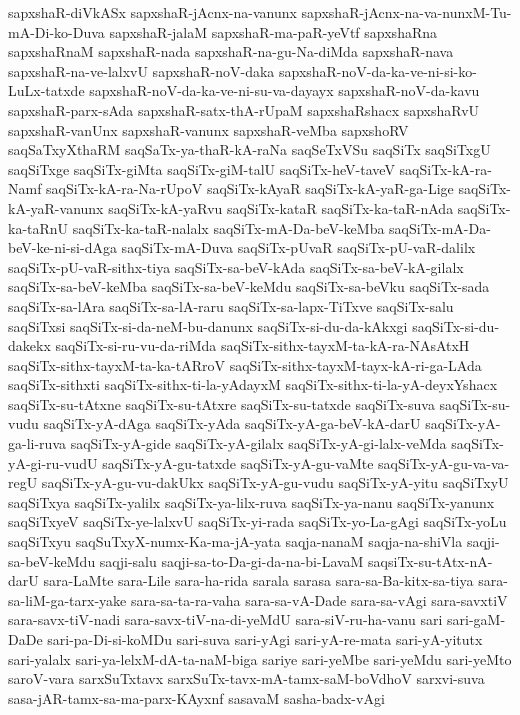 {sapxshaR-diVkASx
sapxshaR-jAcnx-na-vanunx
sapxshaR-jAcnx-na-va-nunxM-Tu-mA-Di-ko-Duva
sapxshaR-jalaM
sapxshaR-ma-paR-yeVtf
sapxshaRna
sapxshaRnaM
sapxshaR-nada
sapxshaR-na-gu-Na-diMda
sapxshaR-nava
sapxshaR-na-ve-lalxvU
sapxshaR-noV-daka
sapxshaR-noV-da-ka-ve-ni-si-ko-LuLx-tatxde
sapxshaR-noV-da-ka-ve-ni-su-va-dayayx
sapxshaR-noV-da-kavu
sapxshaR-parx-sAda
sapxshaR-satx-thA-rUpaM
sapxshaRshacx
sapxshaRvU
sapxshaR-vanUnx
sapxshaR-vanunx
sapxshaR-veMba
sapxshoRV
saqSaTxyXthaRM
saqSaTx-ya-thaR-kA-raNa
saqSeTxVSu
saqSiTx
saqSiTxgU
saqSiTxge
saqSiTx-giMta
saqSiTx-giM-talU
saqSiTx-heV-taveV
saqSiTx-kA-ra-Namf
saqSiTx-kA-ra-Na-rUpoV
saqSiTx-kAyaR
saqSiTx-kA-yaR-ga-Lige
saqSiTx-kA-yaR-vanunx
saqSiTx-kA-yaRvu
saqSiTx-kataR
saqSiTx-ka-taR-nAda
saqSiTx-ka-taRnU
saqSiTx-ka-taR-nalalx
saqSiTx-mA-Da-beV-keMba
saqSiTx-mA-Da-beV-ke-ni-si-dAga
saqSiTx-mA-Duva
saqSiTx-pUvaR
saqSiTx-pU-vaR-dalilx
saqSiTx-pU-vaR-sithx-tiya
saqSiTx-sa-beV-kAda
saqSiTx-sa-beV-kA-gilalx
saqSiTx-sa-beV-keMba
saqSiTx-sa-beV-keMdu
saqSiTx-sa-beVku
saqSiTx-sada
saqSiTx-sa-lAra
saqSiTx-sa-lA-raru
saqSiTx-sa-lapx-TiTxve
saqSiTx-salu
saqSiTxsi
saqSiTx-si-da-neM-bu-danunx
saqSiTx-si-du-da-kAkxgi
saqSiTx-si-du-dakekx
saqSiTx-si-ru-vu-da-riMda
saqSiTx-sithx-tayxM-ta-kA-ra-NAsAtxH
saqSiTx-sithx-tayxM-ta-ka-tARroV
saqSiTx-sithx-tayxM-tayx-kA-ri-ga-LAda
saqSiTx-sithxti
saqSiTx-sithx-ti-la-yAdayxM
saqSiTx-sithx-ti-la-yA-deyxYshacx
saqSiTx-su-tAtxne
saqSiTx-su-tAtxre
saqSiTx-su-tatxde
saqSiTx-suva
saqSiTx-su-vudu
saqSiTx-yA-dAga
saqSiTx-yAda
saqSiTx-yA-ga-beV-kA-darU
saqSiTx-yA-ga-li-ruva
saqSiTx-yA-gide
saqSiTx-yA-gilalx
saqSiTx-yA-gi-lalx-veMda
saqSiTx-yA-gi-ru-vudU
saqSiTx-yA-gu-tatxde
saqSiTx-yA-gu-vaMte
saqSiTx-yA-gu-va-va-regU
saqSiTx-yA-gu-vu-dakUkx
saqSiTx-yA-gu-vudu
saqSiTx-yA-yitu
saqSiTxyU
saqSiTxya
saqSiTx-yalilx
saqSiTx-ya-lilx-ruva
saqSiTx-ya-nanu
saqSiTx-yanunx
saqSiTxyeV
saqSiTx-ye-lalxvU
saqSiTx-yi-rada
saqSiTx-yo-La-gAgi
saqSiTx-yoLu
saqSiTxyu
saqSuTxyX-numx-Ka-ma-jA-yata
saqja-nanaM
saqja-na-shiVla
saqji-sa-beV-keMdu
saqji-salu
saqji-sa-to-Da-gi-da-na-bi-LavaM
saqsiTx-su-tAtx-nA-darU
sara-LaMte
sara-Lile
sara-ha-rida
sarala
sarasa
sara-sa-Ba-kitx-sa-tiya
sara-sa-liM-ga-tarx-yake
sara-sa-ta-ra-vaha
sara-sa-vA-Dade
sara-sa-vAgi
sara-savxtiV
sara-savx-tiV-nadi
sara-savx-tiV-na-di-yeMdU
sara-siV-ru-ha-vanu
sari
sari-gaM-DaDe
sari-pa-Di-si-koMDu
sari-suva
sari-yAgi
sari-yA-re-mata
sari-yA-yitutx
sari-yalalx
sari-ya-lelxM-dA-ta-naM-biga
sariye
sari-yeMbe
sari-yeMdu
sari-yeMto
saroV-vara
sarxSuTxtavx
sarxSuTx-tavx-mA-tamx-saM-boVdhoV
sarxvi-suva
sasa-jAR-tamx-sa-ma-parx-KAyxnf
sasavaM
sasha-badx-vAgi
}
